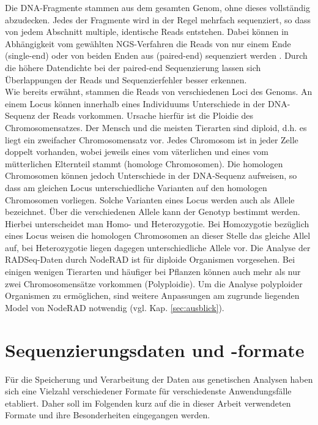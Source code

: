 Die DNA-Fragmente stammen aus dem gesamten Genom, ohne dieses vollständig abzudecken. Jedes der Fragmente wird in der Regel mehrfach sequenziert, so dass von jedem Abschnitt multiple, identische Reads entstehen. Dabei können in Abhängigkeit vom gewählten NGS-Verfahren die Reads von nur einem Ende (single-end) oder von beiden Enden aus (paired-end) sequenziert werden \cite{mardis_2017, rizzo_2012, ambardar_2016}. Durch die höhere Datendichte bei der paired-end Sequenzierung lassen sich Überlappungen der Reads und Sequenzierfehler besser erkennen. \\

Wie bereits erwähnt, stammen die Reads von verschiedenen Loci des Genoms. An einem Locus können innerhalb eines Individuums Unterschiede in der DNA-Sequenz der Reads vorkommen. Ursache hierfür ist die Ploidie des Chromosomensatzes. Der Mensch und die meisten Tierarten sind diploid, d.h. es liegt ein zweifacher Chromosomensatz vor. Jedes Chromosom ist in jeder Zelle doppelt vorhanden, wobei jeweils eines vom väterlichen und eines vom mütterlichen Elternteil stammt (homologe Chromosomen). Die homologen Chromosomen können jedoch Unterschiede in der DNA-Sequenz aufweisen, so dass am gleichen Locus unterschiedliche Varianten auf den homologen Chromosomen vorliegen. Solche Varianten eines Locus werden auch als Allele bezeichnet. Über die verschiedenen Allele kann der Genotyp bestimmt werden. Hierbei unterscheidet man Homo- und Heterozygotie. Bei  Homozygotie bezüglich eines Locus weisen die homologen Chromosomen an dieser Stelle das gleiche Allel auf, bei Heterozygotie liegen dagegen unterschiedliche Allele vor. Die Analyse der RADSeq-Daten durch NodeRAD ist für diploide Organismen vorgesehen. Bei einigen wenigen Tierarten und häufiger bei Pflanzen können auch mehr als nur zwei Chromosomensätze vorkommen (Polyploidie). Um die Analyse polyploider Organismen zu ermöglichen, sind weitere Anpassungen am zugrunde liegenden Model von NodeRAD notwendig (vgl. Kap. \ref{sec:ausblick}).

\section{Sequenzierungsdaten und -formate}

Für die Speicherung und Verarbeitung der Daten aus genetischen Analysen haben sich eine Vielzahl verschiedener Formate für verschiedenste Anwendungsfälle etabliert. Daher soll im Folgenden kurz auf die in dieser Arbeit verwendeten Formate und ihre Besonderheiten eingegangen werden.


